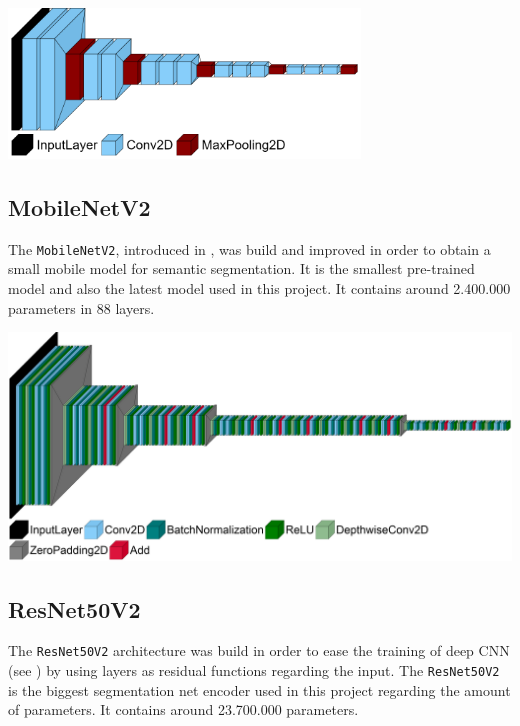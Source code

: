 \begin{minipage}[t]{\textwidth}
    \centering
	\includegraphics[width=0.7\textwidth]{Images/model_plot/vgg16.png}
	\label{fig:architetcture_vgg16}
	\vspace{5mm}
\end{minipage}
	
\subsection{MobileNetV2}
The \verb|MobileNetV2|, introduced in \cite{sandler2019mobilenetv2}, was build and improved in order to obtain a small mobile model for semantic segmentation. It is the smallest pre-trained model and also the latest model used in this project. It contains around 2.400.000 parameters in 88 layers.\\

\begin{minipage}[t]{\textwidth}
	\includegraphics[width=\textwidth]{Images/model_plot/mobilenet_v2.png}
	\label{fig:architetcture_mobilenet_v2}
\end{minipage}

\subsection{ResNet50V2}
The \verb|ResNet50V2| architecture was build in order to ease the training of deep CNN (see \cite{He_2016_CVPR}) by using layers as residual functions regarding the input. The \verb|ResNet50V2| is the biggest segmentation net encoder used in this project regarding the amount of parameters. It contains around 23.700.000 parameters.\\

